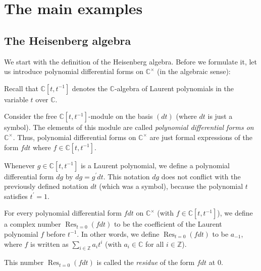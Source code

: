 \documentclass[etingof-lie.tex]{subfiles}
\begin{document}
\section{The main examples}

\subsection{The Heisenberg algebra}

We start with the definition of the Heisenberg algebra. Before we formulate
it, let us introduce polynomial differential forms on $\mathbb{C}^{\times}$
(in the algebraic sense):

\begin{definition}
\label{def.diffform}Recall that $\mathbb{C}\left[  t,t^{-1}\right]  $ denotes
the $\mathbb{C}$-algebra of Laurent polynomials in the variable $t$ over
$\mathbb{C}$.

Consider the free $\mathbb{C}\left[  t,t^{-1}\right]  $-module on the basis
$\left(  dt\right)  $ (where $dt$ is just a symbol). The elements of this
module are called \textit{polynomial differential forms on }$\mathbb{C}%
^{\times}$. Thus, polynomial differential forms on $\mathbb{C}^{\times}$ are
just formal expressions of the form $fdt$ where $f\in\mathbb{C}\left[
t,t^{-1}\right]  $.

Whenever $g\in\mathbb{C}\left[  t,t^{-1}\right]  $ is a Laurent polynomial, we
define a polynomial differential form $dg$ by $dg=g^{\prime}dt$. This notation
$dg$ does not conflict with the previously defined notation $dt$ (which was a
symbol), because the polynomial $t$ satisfies $t^{\prime}=1$.
\end{definition}

\begin{definition}
\label{def.res}For every polynomial differential form $fdt$ on $\mathbb{C}%
^{\times}$ (with $f\in\mathbb{C}\left[  t,t^{-1}\right]  $), we define a
complex number $\operatorname*{Res}\nolimits_{t=0}\left(  fdt\right)  $ to be
the coefficient of the Laurent polynomial $f$ before $t^{-1}$. In other words,
we define $\operatorname*{Res}\nolimits_{t=0}\left(  fdt\right)  $ to be
$a_{-1}$, where $f$ is written as $\sum\limits_{i\in\mathbb{Z}}a_{i}t^{i}$
(with $a_{i}\in\mathbb{C}$ for all $i\in\mathbb{Z}$).

This number $\operatorname*{Res}\nolimits_{t=0}\left(  fdt\right)  $ is called
the \textit{residue} of the form $fdt$ at $0$.
\end{definition}
\end{document}
